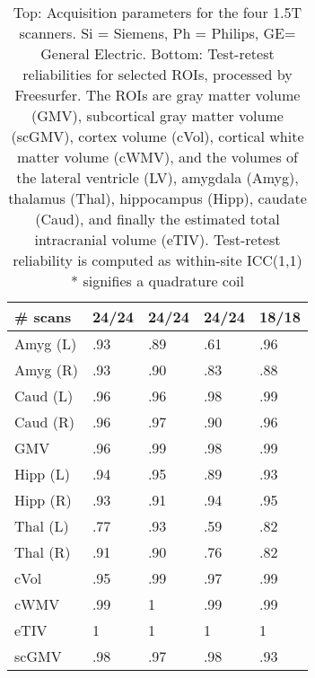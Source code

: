 \begin{table}
\begin{tabular}{lllll}
\# scans              & 24/24 & 24/24 & 24/24 &18/18\\
\midrule
Amyg (L)              &               .93 &               .89 &                 .61 &                 .96 \\
Amyg (R)              &               .93 &               .90 &                 .83 &                 .88 \\
Caud (L)              &               .96 &               .96 &                 .98 &                 .99 \\
Caud (R)              &               .96 &               .97 &                 .90 &                 .96 \\
GMV                   &               .96 &               .99 &                 .98 &                 .99 \\
Hipp (L)              &               .94 &               .95 &                 .89 &                 .93 \\
Hipp (R)              &               .93 &               .91 &                 .94 &                 .95 \\
Thal (L)              &               .77 &               .93 &                 .59 &                 .82 \\
Thal (R)              &               .91 &               .90 &                 .76 &                 .82 \\
cVol                  &               .95 &               .99 &                 .97 &                 .99 \\
cWMV                  &               .99 &               1 &                 .99 &                 .99 \\
eTIV                  &               1 &               1 &                 1 &                 1 \\
scGMV                 &               .98 &               .97 &                 .98 &                 .93 \\
\bottomrule
\end{tabular}
\caption{Top: Acquisition parameters for the four 1.5T scanners. Si = Siemens, Ph = Philips, GE= General Electric. Bottom: Test-retest reliabilities for selected ROIs, processed by Freesurfer. The ROIs are gray matter volume (GMV), subcortical gray matter volume (scGMV), cortex volume (cVol), cortical white matter volume (cWMV), and the volumes of the lateral ventricle (LV), amygdala (Amyg), thalamus (Thal), hippocampus (Hipp), caudate (Caud), and finally the estimated total intracranial volume (eTIV). Test-retest reliability is computed as within-site ICC(1,1) \\ * signifies a quadrature coil} 
\label{tab:acquisition1}

\end{table}